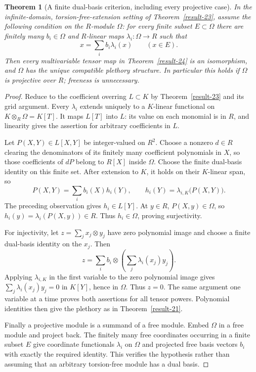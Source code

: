\documentclass[11pt,a4paper]{article}
\newtheorem{theorem}{Theorem}[section]
\theoremstyle{definition}
\begin{document}
\begin{theorem}[A finite dual-basis criterion, including every projective case]\label{result-25}
In the infinite-domain, torsion-free-extension setting of Theorem~\ref{result-23},
assume the following condition on the $R$-module $\Omega$: for every
finite subset $E\subset\Omega$ there are finitely many
$b_i\in\Omega$ and $R$-linear maps $\lambda_i:\Omega\to R$ such that
\[
 x=\sum_i b_i\lambda_i(x)\qquad(x\in E).
\]
Then every multivariable tensor map in Theorem~\ref{result-24} is an isomorphism,
and $\Omega$ has the unique compatible plethory structure.
In particular this holds if $\Omega$ is projective over $R$;
freeness is unnecessary.
\end{theorem}
\begin{proof}
Reduce to the coefficient overring $L\subset K$ by Theorem~\ref{result-23} and
its grid argument. Every $\lambda_i$ extends uniquely to a
$K$-linear functional on $K\otimes_R\Omega=K[T]$.
It maps $L[T]$ into $L$: its value on each monomial is in $R$,
and linearity gives the assertion for arbitrary coefficients in $L$.

Let $P(X,Y)\in L[X,Y]$ be integer-valued on $R^2$. Choose a nonzero
$d\in R$ clearing the denominators of its finitely many coefficient
polynomials in $X$, so those coefficients of $dP$ belong to $R[X]$
inside $\Omega$. Choose the finite dual-basis identity on this finite
set. After extension to $K$, it holds on their $K$-linear span,
so
\[
 P(X,Y)=\sum_i b_i(X)h_i(Y),\qquad
 h_i(Y)=\lambda_{i,K}\bigl(P(X,Y)\bigr).
\]
The preceding observation gives $h_i\in L[Y]$. At $y\in R$,
$P(X,y)\in\Omega$, so $h_i(y)=\lambda_i(P(X,y))\in R$.
Thus $h_i\in\Omega$, proving surjectivity.

For injectivity, let $z=\sum_j x_j\otimes y_j$ have zero polynomial
image and choose a finite dual-basis identity on the $x_j$. Then
\[
 z=\sum_i b_i\otimes\left(\sum_j\lambda_i(x_j)y_j\right).
\]
Applying $\lambda_{i,K}$ in the first variable to the zero polynomial
image gives $\sum_j\lambda_i(x_j)y_j=0$ in $K[Y]$, hence in $\Omega$.
Thus $z=0$. The same argument one variable at a time proves both
assertions for all tensor powers. Polynomial identities then give
the plethory as in Theorem~\ref{result-21}.

Finally a projective module is a summand of a free module. Embed
$\Omega$ in a free module and project back. The finitely many free
coordinates occurring in a finite subset $E$ give coordinate
functionals $\lambda_i$ on $\Omega$ and projected free basis vectors
$b_i$ with exactly the required identity. This verifies the
hypothesis rather than assuming that an arbitrary torsion-free
module has a dual basis.
\end{proof}
\end{document}
